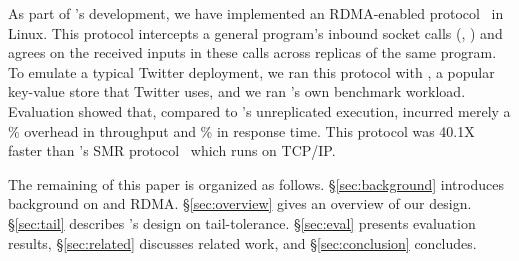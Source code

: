 As part of \xxx's development, we have implemented an RDMA-enabled \paxos 
protocol~\cite{falcon:github} in Linux. This protocol intercepts a general 
program's inbound socket calls (\eg, \recv) and agrees on the received inputs 
in these calls across replicas of the same program. To emulate a typical 
Twitter deployment, we ran this protocol with \redis, a popular key-value store 
that Twitter uses, and we ran \redis's own benchmark workload. Evaluation 
showed that, compared to \redis's unreplicated execution, \xxx
incurred merely a \tputoverhead\% overhead in throughput and \latencyoverhead\% 
in response time. This protocol was 40.1X faster than \zookeeper's SMR 
protocol~\cite{calvin:sigmod12} which runs on TCP/IP.


The remaining of this paper is organized as follows. \S\ref{sec:background} 
introduces background on \paxos and RDMA. \S\ref{sec:overview} gives an 
overview of our \xxx design. \S\ref{sec:tail} describes \xxx's design on 
tail-tolerance. \S\ref{sec:eval} presents evaluation results, 
\S\ref{sec:related} discusses related work, and \S\ref{sec:conclusion} 
concludes.   


